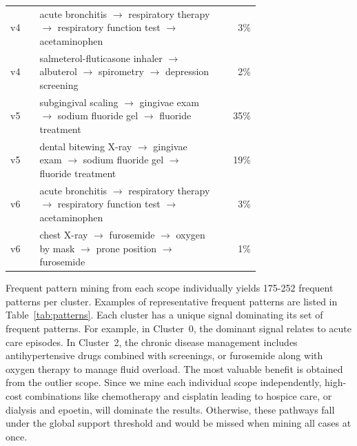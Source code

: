 \begin{table}[t]
\begin{tabular}{@{}l p{0.72\linewidth} r@{}}
\addlinespace

v4 & acute bronchitis $\rightarrow$ respiratory therapy $\rightarrow$ respiratory function test $\rightarrow$ acetaminophen & 3\% \\

v4 & salmeterol-fluticasone inhaler $\rightarrow$ albuterol $\rightarrow$ spirometry $\rightarrow$ depression screening & 2\% \\

\addlinespace

v5 & subgingival scaling $\rightarrow$ gingivae exam $\rightarrow$ sodium fluoride gel $\rightarrow$ fluoride treatment & 35\% \\

v5 & dental bitewing X-ray $\rightarrow$ gingivae exam $\rightarrow$ sodium fluoride gel $\rightarrow$ fluoride treatment & 19\% \\

\addlinespace

v6 & acute bronchitis $\rightarrow$ respiratory therapy $\rightarrow$ respiratory function test $\rightarrow$ acetaminophen & 3\% \\

v6 & chest X-ray $\rightarrow$ furosemide $\rightarrow$ oxygen by mask $\rightarrow$ prone position $\rightarrow$ furosemide & 1\% \\

\bottomrule

\end{tabular}

\end{table}

Frequent pattern mining from each scope individually yields 175-252 frequent patterns per cluster. Examples of representative frequent patterns are listed in Table~\ref{tab:patterns}. Each cluster has a unique signal dominating its set of frequent patterns. For example, in Cluster~0, the dominant signal relates to acute care episodes. In Cluster~2, the chronic disease management includes antihypertensive drugs combined with screenings, or furosemide along with oxygen therapy to manage fluid overload. The most valuable benefit is obtained from the outlier scope. Since we mine each individual scope independently, high-cost combinations like chemotherapy and cisplatin leading to hospice care, or dialysis and epoetin, will dominate the results. Otherwise, these pathways fall under the global support threshold and would be missed when mining all cases at once.


